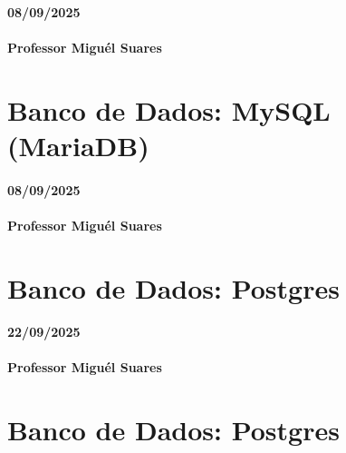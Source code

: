 \documentclass[
]{book}
\begin{document}
\subsubsection*{08/09/2025}\label{section-7}

\subsubsection*{Professor Miguél Suares}\label{professor-miguuxe9l-suares-7}

\chapter{Banco de Dados: MySQL (MariaDB)}\label{banco-de-dados-mysql-mariadb-1}

\subsubsection*{08/09/2025}\label{section-8}

\subsubsection*{Professor Miguél Suares}\label{professor-miguuxe9l-suares-8}

\chapter{Banco de Dados: Postgres}\label{banco-de-dados-postgres}

\subsubsection*{22/09/2025}\label{section-9}

\subsubsection*{Professor Miguél Suares}\label{professor-miguuxe9l-suares-9}

\chapter{Banco de Dados: Postgres}\label{banco-de-dados-postgres-1}
\end{document}
